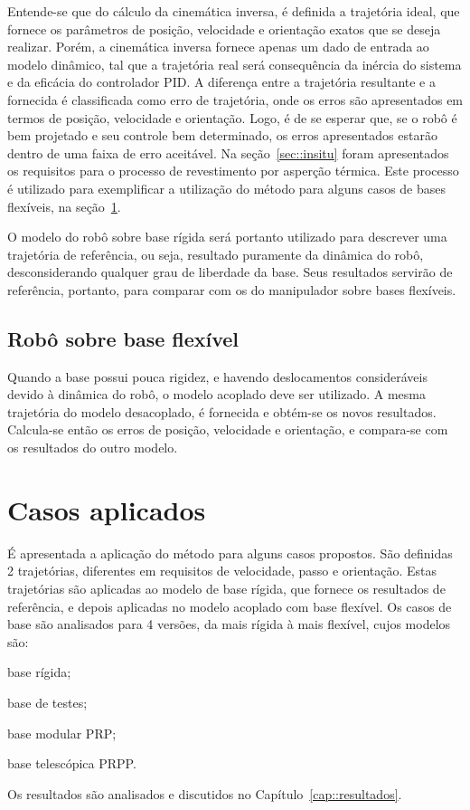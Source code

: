 Entende-se que do cálculo da cinemática inversa, é definida a trajetória ideal,
que fornece os parâmetros de posição, velocidade e orientação exatos que se
deseja realizar.
Porém, a cinemática inversa fornece apenas um dado de entrada ao modelo
dinâmico, tal que a trajetória real será consequência da inércia do sistema e da
eficácia do controlador PID. A diferença entre a trajetória resultante e a
fornecida é classificada como erro de trajetória, onde os erros são apresentados
em termos de posição, velocidade e orientação. Logo, é de se esperar que, se o robô
é bem projetado e seu controle bem determinado, os erros apresentados estarão
dentro de uma faixa de erro aceitável. Na seção~\ref{sec::insitu} foram
apresentados os requisitos para o processo de revestimento por asperção
térmica. Este processo é utilizado para exemplificar a utilização do método
para alguns casos de bases flexíveis, na seção~\ref{sec::casos}.

O modelo do robô sobre base rígida será portanto utilizado para descrever uma
trajetória de referência, ou seja, resultado puramente da dinâmica do robô,
desconsiderando qualquer grau de liberdade da base. Seus resultados servirão de
referência, portanto, para comparar com os do manipulador sobre bases flexíveis.

\subsection{Robô sobre base flexível}

Quando a base possui pouca rigidez, e havendo deslocamentos consideráveis devido
à dinâmica do robô, o modelo acoplado deve ser utilizado. A mesma trajetória do
modelo desacoplado, é fornecida e obtém-se os novos resultados. Calcula-se então
os erros de posição, velocidade e orientação, e compara-se com os resultados do
outro modelo.




\section{Casos aplicados}\label{sec::casos}

É apresentada a aplicação do método para alguns casos propostos. São definidas 2
trajetórias, diferentes em requisitos de velocidade, passo e orientação. Estas
trajetórias são aplicadas ao modelo de base rígida, que fornece os resultados de
referência, e depois aplicadas no modelo acoplado com base flexível. Os casos de
base são analisados para 4 versões, da mais rígida à mais flexível, cujos modelos são:
%
\begin{enumerate*}[label=\emph{\roman*})]
	\item base rígida;
	\item base de testes;
	\item base modular PRP;
	\item base telescópica PRPP.
\end{enumerate*}
%
Os resultados são analisados e discutidos no
Capítulo~\ref{cap::resultados}.

